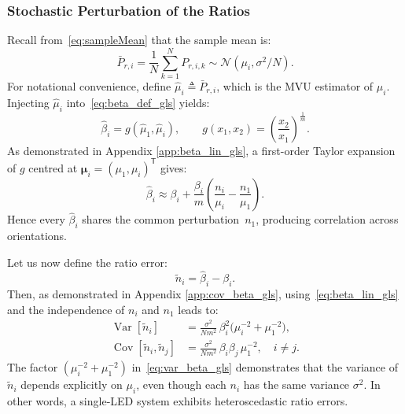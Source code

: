 \documentclass[journal]{IEEEtran}
\begin{document}
\subsubsection{Stochastic Perturbation of the Ratios}
Recall from~\eqref{eq:sampleMean} that the sample mean is:
\begin{equation}
\bar P_{r,i}=\frac1N\sum_{k=1}^NP_{r,i,k}
 \sim\mathcal N(\mu_i,\sigma^{2}/N).
\end{equation}
For notational convenience, define $\hat{\mu}_i \triangleq \bar P_{r,i}$, which is the MVU estimator of $\mu_i$.
Injecting $\hat\mu_i$ into~\eqref{eq:beta_def_gls} yields:
\begin{equation}
  \hat\beta_i
  =g(\hat\mu_1,\hat\mu_i),
  \qquad
  g(x_1,x_2)=\left(\frac{x_2}{x_1}\right)^{\frac{1}{m}}.
\end{equation}
As demonstrated in Appendix \ref{app:beta_lin_gls}, a first-order Taylor expansion of $g$ centred at
$\boldsymbol\mu_i=(\mu_1,\mu_i)^{\mathsf T}$ gives:
\begin{equation}
  \hat\beta_i
  \approx
  \beta_i
  +\frac{\beta_i}{m}
   \!\left(\frac{n_i}{\mu_i}-\frac{n_1}{\mu_1}\right).
  \label{eq:beta_lin_gls}
\end{equation}
Hence every $\hat\beta_i$ shares the common perturbation~$n_1$,
producing correlation across orientations.

Let us now define the ratio error:
\begin{equation}
\tilde{n}_i=\hat\beta_i-\beta_i.
\label{eq:ratio_error}
\end{equation}
Then, as demonstrated in Appendix \ref{app:cov_beta_gls}, using~\eqref{eq:beta_lin_gls}
and the independence of $n_i$ and $n_1$ leads to:
\begin{align}
  \operatorname{Var}[\tilde{n}_i]
  &=
  \frac{\sigma^{2}}{Nm^{2}}\,
  \beta_i^{2}\bigl(\mu_i^{-2}+\mu_1^{-2}\bigr),
  \label{eq:var_beta_gls}\\
  \operatorname{Cov}[\tilde{n}_i,\tilde{n}_j]
  &=
  \frac{\sigma^{2}}{Nm^{2}}\,
  \beta_i\beta_j\,\mu_1^{-2},
  \quad i\neq j.
  \label{eq:cov_beta_gls}
\end{align}
The factor $(\mu_i^{-2} + \mu_1^{-2})$ in~\eqref{eq:var_beta_gls}
demonstrates that the variance of $\tilde{n}_i$ depends explicitly on
$\mu_i$, even though each $n_i$ has the same variance
$\sigma^2$.  In other words, a single‐LED system exhibits
heteroscedastic ratio errors.
\end{document}
